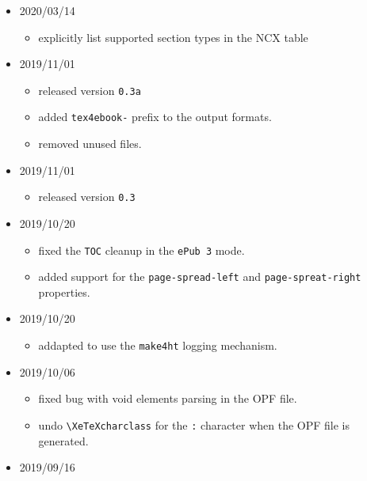 \begin{itemize}
  \begin{itemize}
  \tightlist
  \item
    remove child elements from elements that don't allow them in the OPF
    and NCX file.
  \end{itemize}
\item
  2020/03/14

  \begin{itemize}
  \tightlist
  \item
    explicitly list supported section types in the NCX table
  \end{itemize}
\item
  2019/11/01

  \begin{itemize}
  \tightlist
  \item
    released version \texttt{0.3a}
  \item
    added \texttt{tex4ebook-} prefix to the output formats.
  \item
    removed unused files.
  \end{itemize}
\item
  2019/11/01

  \begin{itemize}
  \tightlist
  \item
    released version \texttt{0.3}
  \end{itemize}
\item
  2019/10/20

  \begin{itemize}
  \tightlist
  \item
    fixed the \texttt{TOC} cleanup in the \texttt{ePub\ 3} mode.
  \item
    added support for the \texttt{page-spread-left} and
    \texttt{page-spreat-right} properties.
  \end{itemize}
\item
  2019/10/20

  \begin{itemize}
  \tightlist
  \item
    addapted to use the \texttt{make4ht} logging mechanism.
  \end{itemize}
\item
  2019/10/06

  \begin{itemize}
  \tightlist
  \item
    fixed bug with void elements parsing in the OPF file.
  \item
    undo \texttt{\textbackslash{}XeTeXcharclass} for the \texttt{:}
    character when the OPF file is generated.
  \end{itemize}
\item
  2019/09/16


\end{itemize}
